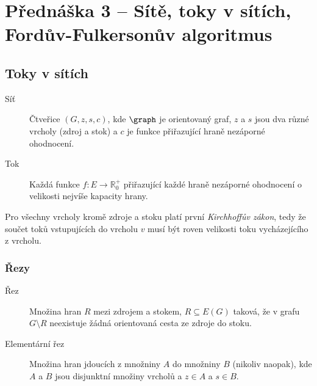 \section{Přednáška 3 -- Sítě, toky v sítích, Fordův-Fulkersonův algoritmus}

\subsection{Toky v sítích}

\begin{description}
    \item[Síť] Čtveřice $(G, z, s, c)$, kde $\graph$ je orientovaný graf, $z$ a $s$ jsou dva různé vrcholy (zdroj a stok) a $c$ je funkce přiřazující hraně nezáporné ohodnocení.
    \item[Tok] Každá funkce $ f: E \to \mathbb{R}_0^+ $ přiřazující každé hraně nezáporné ohodnocení o velikosti nejvíše kapacity hrany.
\end{description}

Pro všechny vrcholy kromě zdroje a stoku platí první \textit{Kirchhoffův zákon}, tedy že součet toků vstupujících do vrcholu $v$ musí být roven velikosti toku vycházejícího z vrcholu.

\subsubsection{Řezy}

\begin{description}
    \item[Řez] Množina hran $R$ mezi zdrojem a stokem, $R \subseteq E(G)$ taková, že v grafu $G \setminus R$ neexistuje žádná orientovaná cesta ze zdroje do stoku.
    \item[Elementární řez] Množina hran jdoucích z množniny $A$ do množniny $B$ (nikoliv naopak), kde $A$ a $B$ jsou disjunktní množiny vrcholů a $z \in A$ a $s \in B$.
\end{description}




